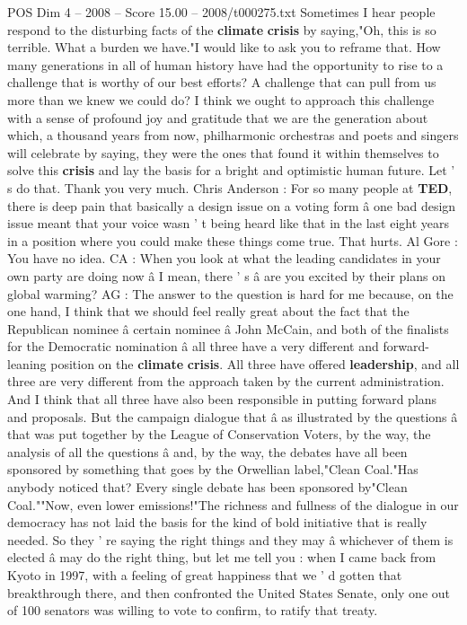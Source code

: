 \begin{textsample}{POS Dim 4 – 2008 – Score 15.00 – 2008/t000275.txt}
Sometimes I hear people respond to the disturbing facts of the \textbf{climate} \textbf{crisis} by saying,"Oh, this is so terrible.
What a burden we have."I would like to ask you to reframe that.
How many generations in all of human history have had the opportunity to rise to a challenge that is worthy of our best efforts?
A challenge that can pull from us more than we knew we could do?
I think we ought to approach this challenge with a sense of profound joy and gratitude that we are the generation about which, a thousand years from now, philharmonic orchestras and poets and singers will celebrate by saying, they were the ones that found it within themselves to solve this \textbf{crisis} and lay the basis for a bright and optimistic human future.
Let ' s do that.
Thank you very much.
Chris Anderson : For so many people at \textbf{TED}, there is deep pain that basically a design issue on a voting form â one bad design issue meant that your voice wasn ' t being heard like that in the last eight years in a position where you could make these things come true.
That hurts.
Al Gore : You have no idea.
CA : When you look at what the leading candidates in your own party are doing now â I mean, there ' s â are you excited by their plans on global warming?
AG : The answer to the question is hard for me because, on the one hand, I think that we should feel really great about the fact that the Republican nominee â certain nominee â John McCain, and both of the finalists for the Democratic nomination â all three have a very different and forward-leaning position on the \textbf{climate} \textbf{crisis}.
All three have offered \textbf{leadership}, and all three are very different from the approach taken by the current administration.
And I think that all three have also been responsible in putting forward plans and proposals.
But the campaign dialogue that â as illustrated by the questions â that was put together by the League of Conservation Voters, by the way, the analysis of all the questions â and, by the way, the debates have all been sponsored by something that goes by the Orwellian label,"Clean Coal."Has anybody noticed that?
Every single debate has been sponsored by"Clean Coal.""Now, even lower emissions!"The richness and fullness of the dialogue in our democracy has not laid the basis for the kind of bold initiative that is really needed.
So they ' re saying the right things and they may â whichever of them is elected â may do the right thing, but let me tell you : when I came back from Kyoto in 1997, with a feeling of great happiness that we ' d gotten that breakthrough there, and then confronted the United States Senate, only one out of 100 senators was willing to vote to confirm, to ratify that treaty.

\end{textsample}
